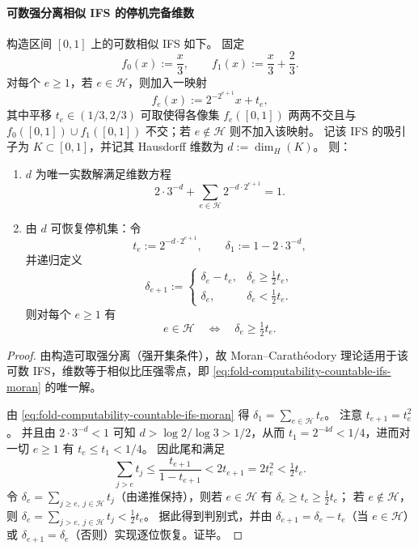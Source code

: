 \paragraph{可数强分离相似 IFS 的停机完备维数}
\begin{theorem}\label{thm:fold-computability-countable-ifs-halting-complete-dimension}
构造区间 \([0,1]\) 上的可数相似 IFS 如下。
固定
\[
f_0(x):=\frac{x}{3},\qquad f_1(x):=\frac{x}{3}+\frac{2}{3}.
\]
对每个 \(e\ge 1\)，若 \(e\in\mathcal H\)，则加入一映射
\[
f_e(x):=2^{-2^{e+1}}x+t_e,
\]
其中平移 \(t_e\in(1/3,2/3)\) 可取使得各像集 \(f_e([0,1])\) 两两不交且与
\(
f_0([0,1])\cup f_1([0,1])
\)
不交；若 \(e\notin\mathcal H\) 则不加入该映射。
记该 IFS 的吸引子为 \(K\subset[0,1]\)，并记其 Hausdorff 维数为 \(d:=\dim_H(K)\)。
则：
\begin{enumerate}
  \item \(d\) 为唯一实数解满足维数方程
  \begin{equation}\label{eq:fold-computability-countable-ifs-moran}
  2\cdot 3^{-d}+\sum_{e\in\mathcal H}2^{-d\cdot 2^{e+1}}=1.
  \end{equation}
  \item 由 \(d\) 可恢复停机集：令
  \[
  t_e:=2^{-d\cdot 2^{e+1}},\qquad
  \delta_1:=1-2\cdot 3^{-d},
  \]
  并递归定义
  \[
  \delta_{e+1}:=
  \begin{cases}
  \delta_e-t_e,& \delta_e\ge \tfrac12 t_e,\\
  \delta_e,& \delta_e<\tfrac12 t_e.
  \end{cases}
  \]
  则对每个 \(e\ge 1\) 有
  \[
  e\in\mathcal H\quad\Longleftrightarrow\quad \delta_e\ge \tfrac12 t_e.
  \]
\end{enumerate}
\end{theorem}
\begin{proof}
由构造可取强分离（强开集条件），故 Moran--Carath\'eodory 理论适用于该可数 IFS，维数等于相似比压强零点，即 \eqref{eq:fold-computability-countable-ifs-moran} 的唯一解。

由 \eqref{eq:fold-computability-countable-ifs-moran} 得
\(
\delta_1=\sum_{e\in\mathcal H}t_e
\)。
注意 \(t_{e+1}=t_e^2\)。
并且由 \(2\cdot 3^{-d}<1\) 可知 \(d>\log 2/\log 3>1/2\)，从而 \(t_1=2^{-4d}<1/4\)，进而对一切 \(e\ge 1\) 有 \(t_e\le t_1<1/4\)。
因此尾和满足
\[
\sum_{j>e}t_j\le \frac{t_{e+1}}{1-t_{e+1}}<2t_{e+1}=2t_e^2<\tfrac12 t_e.
\]
令 \(\delta_e=\sum_{j\ge e,\ j\in\mathcal H}t_j\)（由递推保持），则若 \(e\in\mathcal H\) 有 \(\delta_e\ge t_e\ge \tfrac12 t_e\)；
若 \(e\notin\mathcal H\)，则 \(\delta_e=\sum_{j>e,\ j\in\mathcal H}t_j<\tfrac12 t_e\)。
据此得到判别式，并由 \(\delta_{e+1}=\delta_e-t_e\)（当 \(e\in\mathcal H\)）或 \(\delta_{e+1}=\delta_e\)（否则）实现逐位恢复。证毕。
\end{proof}

\endinput

